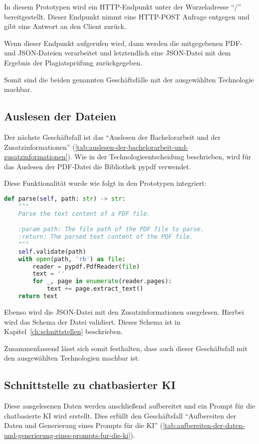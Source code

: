 In diesem Prototypen wird ein HTTP-Endpunkt unter der Wurzeladresse ``/'' bereitgestellt.
Dieser Endpunkt nimmt eine HTTP-POST Anfrage entgegen und gibt eine Antwort an den Client zurück.

Wenn dieser Endpunkt aufgerufen wird, dann werden die mitgegebenen PDF- und JSON-Dateien verarbeitet
und letztendlich eine JSON-Datei mit dem Ergebnis der Plagiatsprüfung zurückgegeben.

Somit sind die beiden genannten Geschäftsfälle mit der ausgewählten Technologie machbar.

\subsection{Auslesen der Dateien}\label{subsec:auslesen-der-dateien}
Der nächste Geschäftsfall ist das ``Auslesen der Bachelorarbeit und der Zusatzinformationen'' (\ref{tab:auslesen-der-bachelorarbeit-und-zusatzinformationen}).
Wie in der Technologieentscheidung beschrieben, wird für das Auslesen der PDF-Datei die Bibliothek pypdf verwendet.

Diese Funktionalität wurde wie folgt in den Prototypen integriert:
\begin{lstlisting}[caption={Auslesen von PDF-Dateien},captionpos=b,label={lst:pypdf}, language=Python, breaklines=true]
def parse(self, path: str) -> str:
    """
    Parse the text content of a PDF file.

    :param path: The file path of the PDF file to parse.
    :return: The parsed text content of the PDF file.
    """
    self.validate(path)
    with open(path, 'rb') as file:
        reader = pypdf.PdfReader(file)
        text = ''
        for _, page in enumerate(reader.pages):
            text += page.extract_text()
    return text
\end{lstlisting}

Ebenso wird die JSON-Datei mit den Zusatzinformationen ausgelesen.
Hierbei wird das Schema der Datei validiert.
Dieses Schema ist in Kapitel~\ref{ch:schnittstellen} beschrieben.

Zusammenfassend lässt sich somit festhalten, dass auch dieser Geschäftsfall mit den ausgewählten Technologien machbar ist.

\subsection{Schnittstelle zu chatbasierter KI}\label{subsec:schnittstelle-zu-chatbasierter-ki}
Diese ausgelesenen Daten werden anschließend aufbereitet und ein Prompt für die chatbasierte KI wird erstellt.
Dies erfüllt den Geschäftsfall ``Aufbereiten der Daten und Generierung eines Prompts für die KI'' (\ref{tab:aufbereiten-der-daten-und-generierung-eines-prompts-fur-die-ki}).

